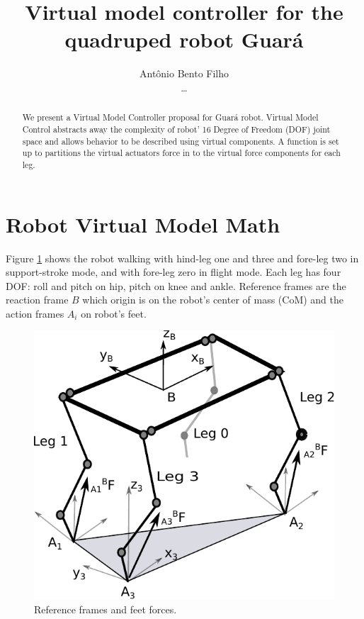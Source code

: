 \documentclass[]{article}
\title{Virtual model controller for the quadruped robot Guar\'a}
\author{Ant\^onio Bento Filho\\\dots}
\begin{document}
\maketitle

\begin{abstract}
We present a Virtual Model Controller \cite{pratt_virtual_1996} proposal for Guará robot. Virtual Model Control abstracts away the complexity of robot' 16 Degree of Freedom (DOF) joint space and allows behavior to be described using virtual components. A function is set up to partitions the virtual actuators force in to the virtual force components for each leg.
\end{abstract}
\section{Robot Virtual Model Math}
Figure \ref{fig:guarawolflegs} shows the robot walking with hind-leg one and three  and fore-leg two in support-stroke mode, and with fore-leg zero in flight mode. Each leg has four DOF: roll and pitch on hip, pitch on knee and ankle. Reference frames are the reaction frame $B$ which origin is on the robot's center of mass (CoM) and the action frames $A_i$ on robot's feet.	
\begin{figure}%
	\centering
	\includegraphics[scale=0.5]{"Figuras/GuaraWolfLegs"}
	\caption{Reference frames and feet forces.}
	\label{fig:guarawolflegs}
\end{figure}
\end{document}
